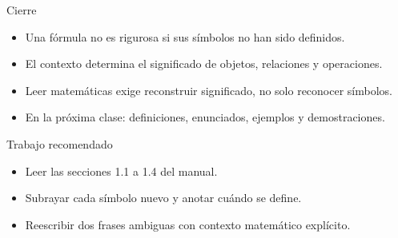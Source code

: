 \documentclass[aspectratio=169,11pt]{beamer}
\begin{document}
\begin{frame}{Cierre}
\begin{itemize}
  \item Una fórmula no es rigurosa si sus símbolos no han sido definidos.
  \item El contexto determina el significado de objetos, relaciones y operaciones.
  \item Leer matemáticas exige reconstruir significado, no solo reconocer símbolos.
  \item En la próxima clase: definiciones, enunciados, ejemplos y demostraciones.
\end{itemize}
\end{frame}

\begin{frame}{Trabajo recomendado}
\begin{itemize}
  \item Leer las secciones 1.1 a 1.4 del manual.
  \item Subrayar cada símbolo nuevo y anotar cuándo se define.
  \item Reescribir dos frases ambiguas con contexto matemático explícito.
\end{itemize}
\end{frame}
\end{document}
